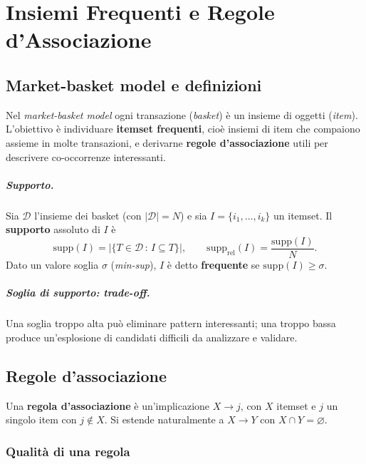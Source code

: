 \chapter{Insiemi Frequenti e Regole d'Associazione}\label{ch:frequent-itemsets}

\section{Market-basket model e definizioni}\label{sec:mbm}
Nel \emph{market-basket model} ogni transazione (\emph{basket}) è un insieme di oggetti (\emph{item}). L'obiettivo è individuare \textbf{itemset frequenti}, cioè insiemi di item che compaiono assieme in molte transazioni, e derivarne \textbf{regole d'associazione} utili per descrivere co-occorrenze interessanti.

\paragraph{Supporto.} Sia $\mathcal{D}$ l'insieme dei basket (con $|\mathcal{D}|=N$) e sia $I=\{i_1,\dots,i_k\}$ un itemset. Il \textbf{supporto} assoluto di $I$ è
\[
\mathrm{supp}(I) = |\{ T\in\mathcal{D}\,:\, I\subseteq T\}|,\qquad \mathrm{supp}_\mathrm{rel}(I)=\frac{\mathrm{supp}(I)}{N}.
\]
Dato un valore soglia $\sigma$ (\emph{min-sup}), $I$ è detto \textbf{frequente} se $\mathrm{supp}(I)\ge \sigma$.

\paragraph{Soglia di supporto: trade-off.} Una soglia troppo alta può eliminare pattern interessanti; una troppo bassa produce un'esplosione di candidati difficili da analizzare e validare.

\section{Regole d'associazione}\label{sec:assoc}
Una \textbf{regola d'associazione} è un'implicazione $X\to j$, con $X$ itemset e $j$ un singolo item con $j\notin X$. Si estende naturalmente a $X\to Y$ con $X\cap Y=\varnothing$.

\subsection{Qualità di una regola}\label{subsec:qualita-regole}
